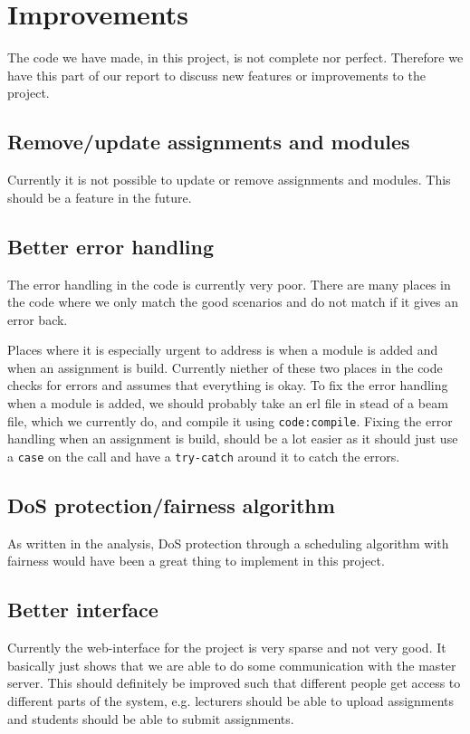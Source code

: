 \section{Improvements}
The code we have made, in this project, is not complete nor perfect. Therefore
we have this part of our report to discuss new features or improvements to the
project.

\subsection{Remove/update assignments and modules}
Currently it is not possible to update or remove assignments and modules. This
should be a feature in the future.

\subsection{Better error handling}
The error handling in the code is currently very poor. There are many places in
the code where we only match the good scenarios and do not match if it gives an
error back.

Places where it is especially urgent to address is when a module is added and
when an assignment is build. Currently niether of these two places in the code
checks for errors and assumes that everything is okay. To fix the error handling
when a module is added, we should probably take an erl file in stead of a beam
file, which we currently do, and compile it using \texttt{code:compile}.
Fixing the error handling when an assignment is build, should be a lot easier
as it should just use a \texttt{case} on the call and have a \texttt{try-catch}
around it to catch the errors.

\subsection{DoS protection/fairness algorithm}
As written in the analysis, DoS protection through a scheduling algorithm with
fairness would have been a great thing to implement in this project.

\subsection{Better interface}
Currently the web-interface for the project is very sparse and not very good.
It basically just shows that we are able to do some communication with the
master server. This should definitely be improved such that different people get
access to different parts of the system, e.g. lecturers should be able to upload
assignments and students should be able to submit assignments.


